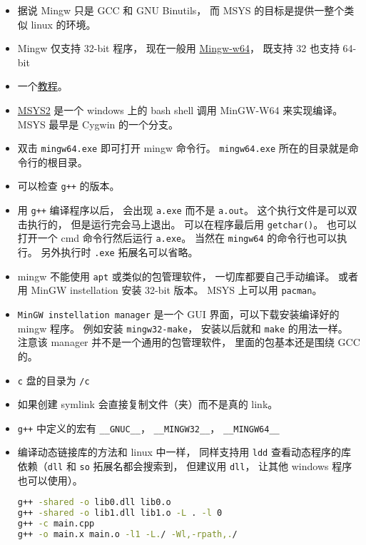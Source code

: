 \begin{itemize}
\item 据说 Mingw 只是 GCC 和 GNU Binutils， 而 MSYS 的目标是提供一整个类似 linux 的环境。
\item Mingw 仅支持 32-bit 程序， 现在一般用 \href{https://www.mingw-w64.org/}{Mingw-w64}， 既支持 32 也支持 64-bit
\item 一个\href{https://www3.ntu.edu.sg/home/ehchua/programming/howto/Cygwin_HowTo.html}{教程}。
\item \href{https://www.msys2.org/}{MSYS2} 是一个 windows 上的 bash shell 调用 MinGW-W64 来实现编译。 MSYS 最早是 Cygwin 的一个分支。
\item 双击 \verb|mingw64.exe| 即可打开 mingw 命令行。 \verb|mingw64.exe| 所在的目录就是命令行的根目录。
\item 可以检查 \verb|g++| 的版本。
\item 用 \verb|g++| 编译程序以后， 会出现 \verb|a.exe| 而不是 \verb|a.out|。 这个执行文件是可以双击执行的， 但是运行完会马上退出。 可以在程序最后用 \verb|getchar()|。 也可以打开一个 cmd 命令行然后运行 \verb|a.exe|。 当然在 \verb|mingw64| 的命令行也可以执行。 另外执行时 \verb|.exe| 拓展名可以省略。
\item mingw 不能使用 \verb|apt| 或类似的包管理软件， 一切库都要自己手动编译。 或者用 MinGW instellation 安装 32-bit 版本。 MSYS 上可以用 \verb|pacman|。
\item \verb|MinGW instellation manager| 是一个 GUI 界面，可以下载安装编译好的 mingw 程序。 例如安装 \verb|mingw32-make|， 安装以后就和 \verb|make| 的用法一样。 注意该 manager 并不是一个通用的包管理软件， 里面的包基本还是围绕 GCC 的。
\item \verb|c| 盘的目录为 \verb|/c|
\item 如果创建 symlink 会直接复制文件（夹）而不是真的 link。
\item \verb|g++| 中定义的宏有 \verb|__GNUC__|， \verb|__MINGW32__|， \verb|__MINGW64__|
\item 编译动态链接库的方法和 linux 中一样， 同样支持用 \verb|ldd| 查看动态程序的库依赖（\verb|dll| 和 \verb|so| 拓展名都会搜索到， 但建议用 \verb|dll|， 让其他 windows 程序也可以使用）。
\begin{lstlisting}[language=bash]
g++ -shared -o lib0.dll lib0.o
g++ -shared -o lib1.dll lib1.o -L . -l 0
g++ -c main.cpp
g++ -o main.x main.o -l1 -L./ -Wl,-rpath,./
\end{lstlisting}
\end{itemize}

